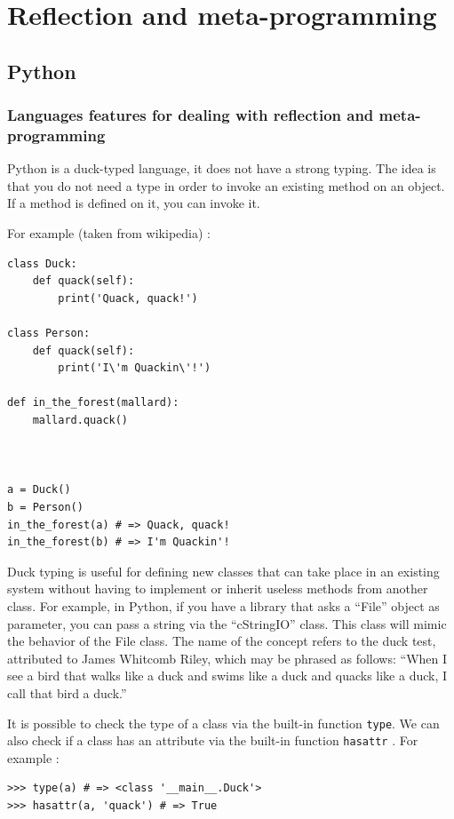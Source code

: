 \documentclass[a4paper,10pt]{article}
\begin{document}
\section{Reflection and meta-programming}

\subsection{Python}
\setpy{}
\subsubsection{Languages features for dealing with reflection and meta-programming}
\setpy{}
Python is a duck-typed language, it does not have a strong typing.
The idea is that you do not need a type in order to invoke an existing method on an object.
If a method is defined on it, you can invoke it.

For example (taken from wikipedia) :

\begin{lstlisting}
class Duck:
    def quack(self):
        print('Quack, quack!')

class Person:
    def quack(self):
        print('I\'m Quackin\'!')

def in_the_forest(mallard):
    mallard.quack()



a = Duck()
b = Person()
in_the_forest(a) # => Quack, quack!
in_the_forest(b) # => I'm Quackin'!
\end{lstlisting}

Duck typing is useful for defining new classes that can take place in an existing system without having to implement or inherit useless methods from another class. For example, in Python, if you have a library that asks a “File” object as parameter, you can pass a string via the  “cStringIO” class. This class will mimic the behavior of the File class. The name of the concept refers to the duck test, attributed to James Whitcomb Riley, which may be phrased as follows: “When I see a bird that walks like a duck and swims like a duck and quacks like a duck, I call that bird a duck.” \cite{ wiki:duck}

It is possible to check the type of a class via the built-in function \lstinline|type|.
We can also check if a class has an attribute via the built-in function \lstinline|hasattr| \cite{python:fct}.
For example :

\begin{lstlisting}
>>> type(a) # => <class '__main__.Duck'>
>>> hasattr(a, 'quack') # => True
\end{lstlisting}
\end{document}
